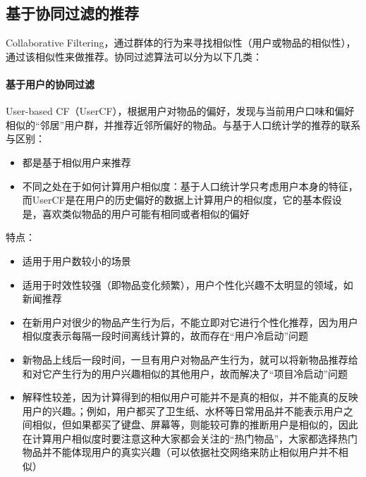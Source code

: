 \subsection{基于协同过滤的推荐}
Collaborative Filtering，通过群体的行为来寻找相似性（用户或物品的相似性），通过该相似性来做推荐。协同过滤算法可以分为以下几类：
\paragraph{基于用户的协同过滤}
User-based CF（UserCF），根据用户对物品的偏好，发现与当前用户口味和偏好相似的“邻居”用户群，并推荐近邻所偏好的物品。与基于人口统计学的推荐的联系与区别：
\begin{itemize}
	\item 都是基于相似用户来推荐
	\item 不同之处在于如何计算用户相似度：基于人口统计学只考虑用户本身的特征，而UserCF是在用户的历史偏好的数据上计算用户的相似度，它的基本假设是，喜欢类似物品的用户可能有相同或者相似的偏好
\end{itemize}
特点：
\begin{itemize}
	\item 适用于用户数较小的场景
	\item 适用于时效性较强（即物品变化频繁），用户个性化兴趣不太明显的领域，如新闻推荐
	\item 在新用户对很少的物品产生行为后，不能立即对它进行个性化推荐，因为用户相似度表示每隔一段时间离线计算的，故而存在“用户冷启动”问题
	\item 新物品上线后一段时间，一旦有用户对物品产生行为，就可以将新物品推荐给和对它产生行为的用户兴趣相似的其他用户，故而解决了“项目冷启动”问题
	\item 解释性较差，因为计算得到的相似用户可能并不是真的相似，并不能真的反映用户的兴趣。；例如，用户都买了卫生纸、水杯等日常用品并不能表示用户之间相似，但如果都买了键盘、屏幕等，则能较可靠的推断用户是相似的，因此在计算用户相似度时要注意这种大家都会关注的“热门物品”，大家都选择热门物品并不能体现用户的真实兴趣（可以依据社交网络来防止相似用户并不相似）
\end{itemize}

